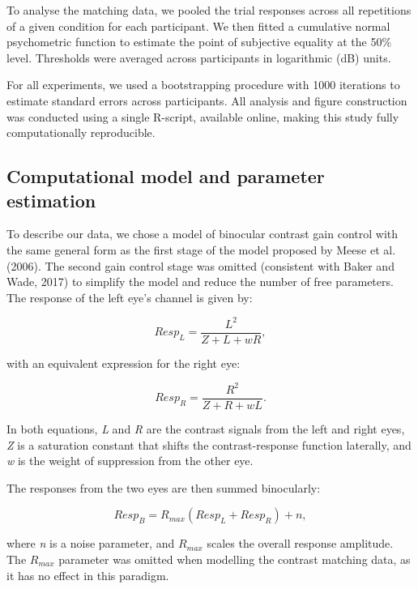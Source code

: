 \documentclass[
]{article}
\begin{document}
To analyse the matching data, we pooled the trial responses across all repetitions of a given condition for each participant. We then fitted a cumulative normal psychometric function to estimate the point of subjective equality at the 50\% level. Thresholds were averaged across participants in logarithmic (dB) units.

For all experiments, we used a bootstrapping procedure with 1000 iterations to estimate standard errors across participants. All analysis and figure construction was conducted using a single R-script, available online, making this study fully computationally reproducible.

\hypertarget{computational-model-and-parameter-estimation}{%
\subsection{Computational model and parameter estimation}\label{computational-model-and-parameter-estimation}}

To describe our data, we chose a model of binocular contrast gain control with the same general form as the first stage of the model proposed by Meese et al. (2006). The second gain control stage was omitted (consistent with Baker and Wade, 2017) to simplify the model and reduce the number of free parameters. The response of the left eye's channel is given by:

\begin{equation}
\label{eq:respL}
Resp_L = \frac{L^2}{Z + L + wR},
\end{equation}

with an equivalent expression for the right eye:

\begin{equation}
\label{eq:respR}
Resp_R = \frac{R^2}{Z + R + wL}.
\end{equation}

In both equations, \emph{L} and \emph{R} are the contrast signals from the left and right eyes, \emph{Z} is a saturation constant that shifts the contrast-response function laterally, and \emph{w} is the weight of suppression from the other eye.

The responses from the two eyes are then summed binocularly:

\begin{equation}
\label{eq:respB}
Resp_B = R_{max}(Resp_L + Resp_R) + n,
\end{equation}

where \emph{n} is a noise parameter, and \(R_{max}\) scales the overall response amplitude. The \(R_{max}\) parameter was omitted when modelling the contrast matching data, as it has no effect in this paradigm.
\end{document}

